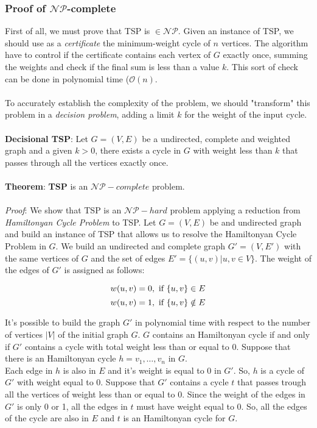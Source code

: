 \subsubsection{Proof of $\mathcal{NP}$-complete}
First of all, we must prove that TSP is $\in \mathcal{NP}$. Given an instance of TSP, we should use as a \textit{certificate} the minimum-weight cycle of $n$ vertices. The algorithm have to control if the certificate contains each vertex of $G$ exactly once, summing the weights and check if the final sum is less than a value $k$. This sort of check can be done in polynomial time ($\mathcal{O}(n)$.\\
\\
\noindent
To accurately establish the complexity of the problem, we should "transform" this problem in a \textit{decision problem}, adding a limit $k$ for the weight of the input cycle.\\
\\
\noindent
\textbf{Decisional TSP}: Let $G = (V,E)$ be a undirected, complete and weighted graph and a given $k > 0$, there exists a cycle in $G$ with weight less than $k$ that passes through all the vertices exactly once.\\
\\
\noindent
\textbf{Theorem}: \textbf{TSP} is an $\mathcal{NP}-complete$ problem.\\
\\
\noindent
\textit{Proof}: We show that TSP is an $\mathcal{NP}-hard$ problem applying a reduction from \textit{Hamiltonyan Cycle Problem} to TSP.
Let $G = (V,E)$ be and undirected graph and build an instance of TSP that allows us to resolve the Hamiltonyan Cycle Problem in $G$. We build an undirected and complete graph $G' = (V, E')$ with the same vertices of $G$ and the set of edges $E' = \{(u, v) | u,v \in V\}$. The weight of the edges of $G'$ is assigned as follows:

\[
    w(u, v) = 0, \textnormal{ if } \{u, v\} \in E
\]
\[
    w(u, v) = 1, \textnormal{ if } \{u, v\} \notin E
\]

It's possible to build the graph $G'$ in polynomial time with respect to the number of vertices $|V|$ of the initial graph $G$. $G$ contains an Hamiltonyan cycle if and only if $G'$ contains a cycle with total weight less than or equal to 0. Suppose that there is an Hamiltonyan cycle $h = v_1, \dots, v_n$ in $G$.\\ \noindent
Each edge in $h$ is also in $E$ and it's weight is equal to 0 in $G'$. So, $h$ is a cycle of $G'$ with weight equal to 0. Suppose that $G'$ contains a cycle $t$ that passes trough all the vertices of weight less than or equal to 0. Since the weight of the edges in $G'$ is only 0 or 1, all the edges in $t$ must have weight equal to 0. So, all the edges of the cycle are also in $E$ and $t$ is an Hamiltonyan cycle for $G$.

